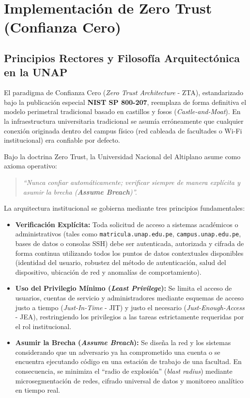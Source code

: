 \chapter{Implementación de Zero Trust (Confianza Cero)}
\label{ch:zero_trust}

\section{Principios Rectores y Filosofía Arquitectónica en la UNAP}

El paradigma de Confianza Cero (\textit{Zero Trust Architecture} - ZTA), estandarizado bajo la publicación especial \textbf{NIST SP 800-207}, reemplaza de forma definitiva el modelo perimetral tradicional basado en castillos y fosos (\textit{Castle-and-Moat}). En la infraestructura universitaria tradicional se asumía erróneamente que cualquier conexión originada dentro del campus físico (red cableada de facultades o Wi-Fi institucional) era confiable por defecto.

Bajo la doctrina Zero Trust, la Universidad Nacional del Altiplano asume como axioma operativo:
\begin{quote}
\centering
\textit{\large ``Nunca confiar automáticamente; verificar siempre de manera explícita y asumir la brecha (\textbf{Assume Breach})''.}
\end{quote}

La arquitectura institucional se gobierna mediante tres principios fundamentales:

\begin{itemize}
    \item \textbf{Verificación Explícita:} Toda solicitud de acceso a sistemas académicos o administrativos (tales como \texttt{matricula.\allowbreak unap.\allowbreak edu.pe}, \texttt{campus.\allowbreak unap.\allowbreak edu.pe}, bases de datos o consolas SSH) debe ser autenticada, autorizada y cifrada de forma continua utilizando todos los puntos de datos contextuales disponibles (identidad del usuario, robustez del método de autenticación, salud del dispositivo, ubicación de red y anomalías de comportamiento).
    \item \textbf{Uso del Privilegio Mínimo (\textit{Least Privilege}):} Se limita el acceso de usuarios, cuentas de servicio y administradores mediante esquemas de acceso justo a tiempo (\textit{Just-In-Time} - JIT) y justo el necesario (\textit{Just-Enough-Access} - JEA), restringiendo los privilegios a las tareas estrictamente requeridas por el rol institucional.
    \item \textbf{Asumir la Brecha (\textit{Assume Breach}):} Se diseña la red y los sistemas considerando que un adversario ya ha comprometido una cuenta o se encuentra ejecutando código en una estación de trabajo de una facultad. En consecuencia, se minimiza el ``radio de explosión'' (\textit{blast radius}) mediante microsegmentación de redes, cifrado universal de datos y monitoreo analítico en tiempo real.
\end{itemize}

